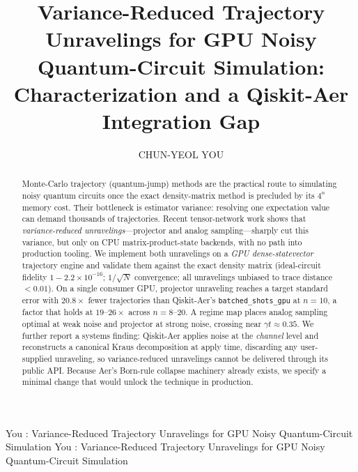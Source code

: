 \documentclass{ieeeaccess}
\begin{document}

\title{Variance-Reduced Trajectory Unravelings for GPU Noisy Quantum-Circuit
Simulation: Characterization and a Qiskit-Aer Integration Gap}

\author{\uppercase{Chun-Yeol You}}
\address[1]{Department of Physics and Chemistry, DGIST, Daegu 42988,
Republic of Korea (ORCID: 0000-0001-9549-8611; e-mail: cyyou@dgist.ac.kr)}

\markboth
{You \headeretal: Variance-Reduced Trajectory Unravelings for GPU Noisy Quantum-Circuit Simulation}
{You \headeretal: Variance-Reduced Trajectory Unravelings for GPU Noisy Quantum-Circuit Simulation}


\begin{abstract}
Monte-Carlo trajectory (quantum-jump) methods are the practical route to simulating noisy
quantum circuits once the exact density-matrix method is precluded by its $4^n$ memory cost.
Their bottleneck is estimator variance: resolving one expectation value can demand thousands of
trajectories. Recent tensor-network work shows that \emph{variance-reduced unravelings}---projector
and analog sampling---sharply cut this variance, but only on CPU matrix-product-state backends,
with no path into production tooling. We implement both unravelings on a \emph{GPU
dense-statevector} trajectory engine and validate them against the exact density matrix
(ideal-circuit fidelity $1-2.2\times10^{-16}$; $1/\sqrt{N}$ convergence; all unravelings unbiased
to trace distance $<0.01$). On a single consumer GPU, projector unraveling reaches a target
standard error with $20.8\times$ fewer trajectories than Qiskit-Aer's
\texttt{batched\_\allowbreak shots\_\allowbreak gpu} at $n=10$, a factor that holds at
$19$--$26\times$ across $n=8$--$20$. A regime map places analog sampling optimal at weak noise and
projector at strong noise, crossing near $\gamma t\approx0.35$. We further report a systems
finding: Qiskit-Aer applies noise at the \emph{channel} level and reconstructs a canonical Kraus
decomposition at apply time, discarding any user-supplied unraveling, so variance-reduced
unravelings cannot be delivered through its public API. Because Aer's Born-rule collapse machinery
already exists, we specify a minimal change that would unlock the technique in production.
\end{abstract}
\end{document}
